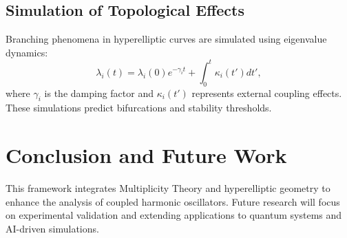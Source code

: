\documentclass{article}
\theoremstyle{plain}
\begin{document}
\subsection{Simulation of Topological Effects}
Branching phenomena in hyperelliptic curves are simulated using eigenvalue dynamics:\newline
\begin{equation}
\lambda_i(t) = \lambda_i(0) e^{-\gamma_i t} + \int_0^t \kappa_i(t') dt',
\end{equation}
where $\gamma_i$ is the damping factor and $\kappa_i(t')$ represents external coupling effects. These simulations predict bifurcations and stability thresholds.


\section{Conclusion and Future Work}
This framework integrates Multiplicity Theory and hyperelliptic geometry to enhance the analysis of coupled harmonic oscillators. Future research will focus on experimental validation and extending applications to quantum systems and AI-driven simulations.


\nocite{*}


\end{document}
